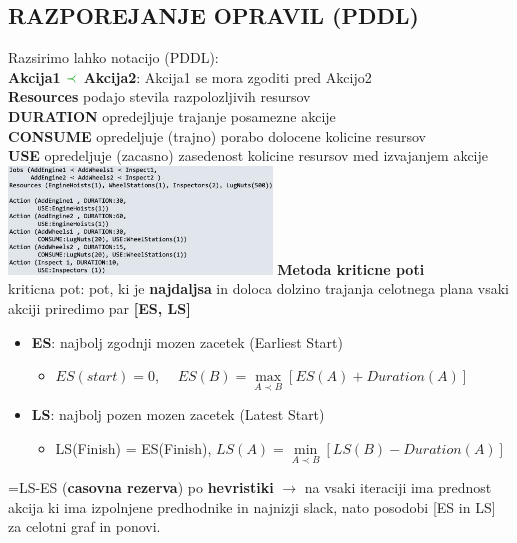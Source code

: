 \subsection{RAZPOREJANJE OPRAVIL (PDDL)}
Razsirimo lahko notacijo (PDDL):\\
\textbf{Akcija1 $\green{\prec}$ Akcija2}: Akcija1 se mora zgoditi pred Akcijo2\\
\textbf{Resources} podajo stevila razpolozljivih resursov\\
\textbf{DURATION} opredejljuje trajanje posamezne akcije\\
\textbf{CONSUME} opredeljuje (trajno) porabo dolocene kolicine resursov\\
\textbf{USE} opredeljuje (zacasno) zasedenost kolicine resursov med izvajanjem akcije\\
\includegraphics[width=7cm]{./images/pddl.png}
\textbf{Metoda kriticne poti}\\
kriticna pot: pot, ki je \textbf{najdaljsa} in doloca dolzino trajanja celotnega plana
vsaki akciji priredimo par \textbf{[ES, LS]}
\begin{itemize}[leftmargin=*,noitemsep,topsep=0pt]
    \item \textbf{ES}: najbolj zgodnji mozen zacetek (Earliest Start)
    \begin{itemize}[leftmargin=*,noitemsep,topsep=0pt]
        \item $ES(start) = 0$, $\quad ES(B) = \max\limits_{A \prec B} \left[ ES(A) + Duration(A)\right]$
    \end{itemize}
    \item \textbf{LS}: najbolj pozen mozen zacetek (Latest Start)
    \begin{itemize}[leftmargin=*,noitemsep,topsep=0pt]
        \item LS(Finish) = ES(Finish), $LS(A) = \min\limits_{A\prec B}\left[ LS(B) - Duration(A)\right]$
    \end{itemize}
\end{itemize}
=LS-ES (\textbf{casovna rezerva})
 po \textbf{hevristiki } $\rightarrow$ na vsaki iteraciji ima prednost akcija 
ki ima izpolnjene predhodnike in najnizji slack, nato posodobi [ES in LS] za celotni graf in ponovi.

